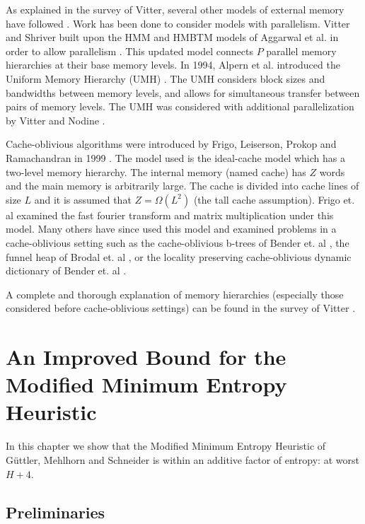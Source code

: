 \documentclass[letterpaper,12pt,titlepage,oneside,final]{book}
\theoremstyle{plain}
\begin{document}
As explained in the survey of Vitter, several other models of external memory have followed \cite{vitter2001external}. Work has been done to consider models with parallelism. Vitter and Shriver built upon the HMM and HMBTM models of Aggarwal et al. \cite{aggarwal1987model, aggarwal1987hierarchical} in order to allow parallelism \cite{vitter1994algorithms}. This updated model connects $P$ parallel memory hierarchies at their base memory levels. In 1994, Alpern et al. introduced the Uniform Memory Hierarchy (UMH) \cite{alpern1994uniform}. The UMH considers block sizes and bandwidths between memory levels, and allows for simultaneous transfer between pairs of memory levels. The UMH was considered with additional parallelization by Vitter and Nodine \cite{vitter1993large}.


Cache-oblivious algorithms were introduced by Frigo, Leiserson, Prokop and Ramachandran in 1999 \cite{frigo1999cache}. The model used is the ideal-cache model which has a two-level memory hierarchy. The internal memory (named cache) has $Z$ words and the main memory is arbitrarily large. The cache is divided into cache lines of size $L$ and it is assumed that $Z=\Omega(L^2)$ (the tall cache assumption). Frigo et. al examined the fast fourier transform and matrix multiplication under this model. Many others have since used this model and examined problems in a cache-oblivious setting such as the cache-oblivious b-trees of Bender et. al \cite{bender2000cache}, the funnel heap of Brodal et. al \cite{brodai2002funnel}, or the locality preserving cache-oblivious dynamic dictionary of Bender et. al \cite{bender2002locality}.

A complete and thorough explanation of memory hierarchies (especially those considered before cache-oblivious settings) can be found in the survey of Vitter \cite{vitter2001external}.



\chapter{An Improved Bound for the Modified Minimum Entropy Heuristic}\label{An Improved Bound for the Modified Minimum Entropy Heuristic}

In this chapter we show that the Modified Minimum Entropy Heuristic of G{\"u}ttler, Mehlhorn and Schneider \cite{guttler1980binary} is within an additive factor of entropy: at worst $H+4$.

\section{Preliminaries}
\end{document}
